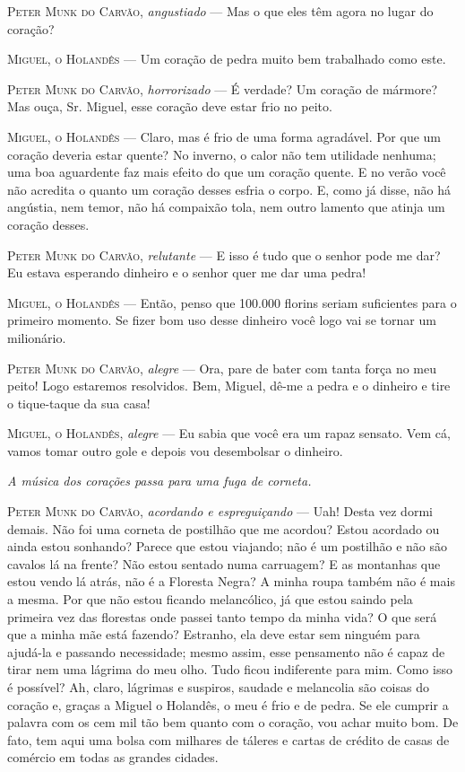 \textsc{Peter Munk do Carvão}, \emph{angustiado} --- Mas o que eles têm agora no
lugar do coração?

\textsc{Miguel, o Holandês} --- Um coração de pedra muito bem trabalhado como este.

\textsc{Peter Munk do Carvão}, \emph{horrorizado} --- É verdade? Um coração de
mármore? Mas ouça, Sr. Miguel, esse coração deve estar frio no peito.

\textsc{Miguel, o Holandês} --- Claro, mas é frio de uma forma agradável. Por que
um coração deveria estar quente? No inverno, o calor não tem utilidade
nenhuma; uma boa aguardente faz mais efeito do que um coração quente. E
no verão você não acredita o quanto um coração desses esfria o corpo. E,
como já disse, não há angústia, nem temor, não há compaixão tola, nem
outro lamento que atinja um coração desses.

\textsc{Peter Munk do Carvão}, \emph{relutante} --- E isso é tudo que o senhor
pode me dar? Eu estava esperando dinheiro e o senhor quer me dar uma
pedra!

\textsc{Miguel, o Holandês} --- Então, penso que 100.000 florins seriam suficientes
para o primeiro momento. Se fizer bom uso desse dinheiro você logo vai
se tornar um milionário.

\textsc{Peter Munk do Carvão}, \emph{alegre} --- Ora, pare de bater com tanta
força no meu peito! Logo estaremos resolvidos. Bem, Miguel, dê-me a
pedra e o dinheiro e tire o tique-taque da sua casa!

\textsc{Miguel, o Holandês}, \emph{alegre} --- Eu sabia que você era um rapaz
sensato. Vem cá, vamos tomar outro gole e depois vou desembolsar o
dinheiro.

\emph{A música dos corações passa para uma fuga de corneta.}

\textsc{Peter Munk do Carvão}, \emph{acordando e espreguiçando} --- Uah! Desta vez
dormi demais. Não foi uma corneta de postilhão que me acordou? Estou
acordado ou ainda estou sonhando? Parece que estou viajando; não é um
postilhão e não são cavalos lá na frente? Não estou sentado numa
carruagem? E as montanhas que estou vendo lá atrás, não é a Floresta
Negra? A minha roupa também não é mais a mesma. Por que não estou
ficando melancólico, já que estou saindo pela primeira vez das florestas
onde passei tanto tempo da minha vida? O que será que a minha mãe está
fazendo? Estranho, ela deve estar sem ninguém para ajudá-la e passando
necessidade; mesmo assim, esse pensamento não é capaz de tirar nem uma
lágrima do meu olho. Tudo ficou indiferente para mim. Como isso é
possível? Ah, claro, lágrimas e suspiros, saudade e melancolia são
coisas do coração e, graças a Miguel o Holandês, o meu é frio e de
pedra. Se ele cumprir a palavra com os cem mil tão bem quanto com o
coração, vou achar muito bom. De fato, tem aqui uma bolsa com milhares
de táleres e cartas de crédito de casas de comércio em todas as grandes
cidades.

